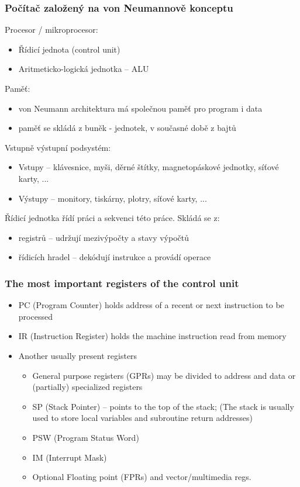 \documentclass{beamer}
\begin{document}
\begin{frame}
\frametitle{Počítač založený na von Neumannově konceptu}

Procesor / mikroprocesor:
\begin{itemize}
\item Řídicí jednota (control unit)
\item Aritmeticko-logická jednotka -- ALU
\end{itemize}

Paměť: 
\begin{itemize}
\item von Neumann architektura má společnou paměť pro program i data
\item paměť se skládá z buněk - jednotek, v současné době z bajtů
\end{itemize}

Vstupně výstupní podsystém:
\begin{itemize}
\item Vstupy -- klávesnice, myši, děrné štítky, magnetopáskové jednotky, síťové karty, ...
\item Výstupy -- monitory, tiskárny, plotry, síťové karty, ...
\end{itemize}

Řídicí jednotka řídí práci a sekvenci této práce. Skládá se z:
\begin{itemize}
\item registrů – udržují mezivýpočty a stavy výpočtů
\item řídicích hradel -- dekódují instrukce a provádí operace
\end{itemize}
\end{frame}


\begin{frame}
\frametitle{The most important registers of the control unit}
\begin{itemize}
\item PC (Program Counter)
holds address of a recent or next instruction to be processed
\item IR (Instruction Register)
holds the machine instruction read from memory
\item Another usually present registers
\begin{itemize}
\item General purpose registers (GPRs)
may be divided to address and data or (partially) specialized registers
\item SP (Stack Pointer) – points to the top of the stack; (The stack is usually used to store local variables and subroutine return addresses)
\item PSW (Program Status Word)
\item IM (Interrupt Mask)
\item Optional Floating point (FPRs) and vector/multimedia regs.
\end{itemize}
\end{itemize}
\end{frame}
\end{document}
